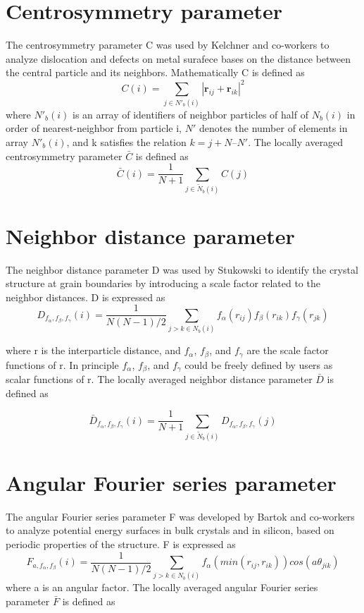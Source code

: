 \section{Centrosymmetry parameter}
The centrosymmetry parameter C was used by Kelchner and co-workers\cite{Kelchner1998} to analyze dislocation and defects on metal surafece bases on the distance between the central particle and its neighbors. Mathematically C is defined as 
\[C(i) = \sum_{j \in N'_b(i)} |\textbf{r}_{ij} + \textbf{r}_{ik}|^2 \]
where $N'_b(i)$ is an array of identifiers of neighbor particles of half of $N_b(i)$ in order of nearest-neighbor from particle i, $N'$ denotes the number of elements in array $N'_b(i)$, and k satisfies the relation $k = j + N – N'$. The locally averaged centrosymmetry parameter $\bar{C}$ is defined as
\[\bar{C}(i) = \frac{1}{N+1} \sum_{j \in \tilde{N}_b(i)} C(j)\]

\section{Neighbor distance parameter}
The neighbor distance parameter D was used by Stukowski\cite{Stukowski2012} to identify the crystal structure at grain boundaries by introducing a scale factor related to the neighbor distances. D is expressed as
\[D_{f_\alpha, f_\beta, f_\gamma}(i) = \frac{1}{N(N-1)/2} \sum_{j>k \in N_b(i)} f_\alpha(r_{ij})f_\beta(r_{ik})f_\gamma(r_{jk}) \]

where r is the interparticle distance, and $f_\alpha$, $f_\beta$, and $f_\gamma$ are the scale factor functions of r. In principle $f_\alpha$, $f_\beta$, and $f_\gamma$ could be freely defined by users as scalar functions of r. The locally averaged neighbor distance parameter $\bar{D}$ is defined as  

\[\bar{D}_{f_\alpha, f_\beta, f_\gamma}(i) = \frac{1}{N+1} \sum_{j \in \tilde{N}_b(i)} D_{f_\alpha, f_\beta, f_\gamma}(j) \]
\section{Angular Fourier series parameter}
The angular Fourier series parameter F was developed by Bartok and co-workers\cite{Bartk2013}\cite{Seko2018} to analyze potential energy surfaces in bulk crystals and in silicon, based on periodic properties of the structure. F is expressed as
\[F_{a,f_\alpha, f_\beta}(i) = \frac{1}{N(N-1)/2}\sum_{j>k \in N_b(i)} f_\alpha(min(r_{ij}, r_{ik})) cos(a\theta_{jik}) \]
where a is an angular factor. The locally averaged angular Fourier series parameter $\bar{F}$ is defined as


